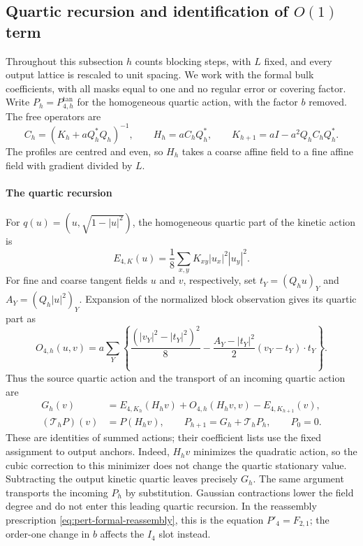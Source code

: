 \documentclass[11pt]{article}
\numberwithin{equation}{section}
\theoremstyle{definition}
\theoremstyle{plain}
\begin{document}
\subsection{Quartic recursion and identification of $O(1)$ term}
\label{subsec:quartic-history}

Throughout this subsection $h$ counts blocking steps, with $L$
fixed, and every output lattice is rescaled to unit spacing.
We work with the formal bulk coefficients, with all masks equal
to one and no regular error or covering factor.  Write
$P_h=P_{4,h}^{\mathrm{tan}}$ for the homogeneous quartic action,
with the factor $b$ removed.  The free operators are
\begin{equation}
 C_h=(K_h+aQ_h^*Q_h)^{-1},\qquad
 H_h=aC_hQ_h^*,\qquad
 K_{h+1}=aI-a^2Q_hC_hQ_h^*.
 \label{eq:quartic-history-free}
\end{equation}
The profiles are centred and even, so $H_h$ takes a coarse affine
field to a fine affine field with gradient divided by $L$.

\paragraph{The quartic recursion}
For $q(u)=(u,\sqrt{1-|u|^2})$, the homogeneous quartic part of
the kinetic action is
\begin{equation}
 E_{4,K}(u)=\frac18\sum_{x,y}K_{xy}|u_x|^2|u_y|^2.
 \label{eq:quartic-tree-kinetic}
\end{equation}
For fine and coarse tangent fields $u$ and $v$, respectively, set
$t_Y=(Q_hu)_Y$ and $A_Y=(Q_h|u|^2)_Y$.  Expansion of the
normalized block observation gives its quartic part as
\begin{equation}
 O_{4,h}(u,v)
 =a\sum_Y\left\{
   \frac{(|v_Y|^2-|t_Y|^2)^2}{8}
   -\frac{A_Y-|t_Y|^2}{2}(v_Y-t_Y)\cdot t_Y
             \right\}.
 \label{eq:quartic-tree-observation}
\end{equation}
Thus the source quartic action and the transport of an incoming
quartic action are
\begin{align}
 G_h(v)&=E_{4,K_h}(H_hv)+O_{4,h}(H_hv,v)
                           -E_{4,K_{h+1}}(v),
 \label{eq:quartic-tree-source}\\
 (\mathcal T_hP)(v)&=P(H_hv),\qquad
 P_{h+1}=G_h+\mathcal T_hP_h,\qquad P_0=0.
 \label{eq:quartic-history-recursion}
\end{align}
These are identities of summed actions; their coefficient lists
use the fixed assignment to output anchors.  Indeed, $H_hv$
minimizes the quadratic action, so the cubic correction to this
minimizer does not change the quartic stationary value.
Subtracting the output kinetic quartic leaves precisely $G_h$.
The same argument transports the incoming $P_h$ by substitution.
Gaussian contractions lower the field degree and do not enter
this leading quartic recursion.  In the reassembly prescription
\eqref{eq:pert-formal-reassembly}, this is the equation
$P'_4=F_{2,1}$; the order-one change in $b$ affects the $I_4$
slot instead.
\end{document}
